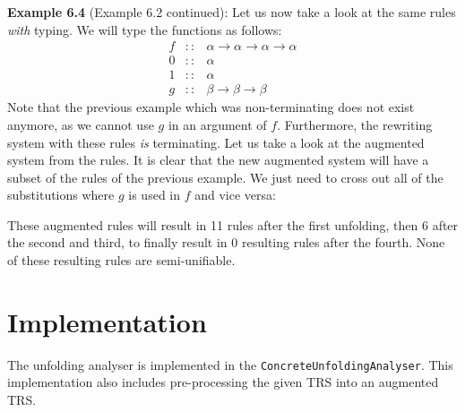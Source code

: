 \textbf{Example 6.4} (Example 6.2 continued): Let us now take a look at the same rules \textit{with} typing. We will type the functions as follows:
\[
\begin{array}{rcl}
    f & :: & \alpha \rightarrow \alpha \rightarrow \alpha \rightarrow \alpha \\
    0 & :: & \alpha \\
    1 & :: & \alpha \\
    g & :: & \beta \rightarrow \beta \rightarrow \beta 
\end{array}
\]
Note that the previous example which was non-terminating does not exist anymore, as we cannot use $g$ in an argument of $f$. Furthermore, the rewriting system with these rules \textit{is} terminating. Let us take a look at the augmented system from the rules. It is clear that the new augmented system will have a subset of the rules of the previous example. We just need to cross out all of the substitutions where $g$ is used in $f$ and vice versa:
\begin{center}
\end{center}
These augmented rules will result in 11 rules after the first unfolding, then 6 after the second and third, to finally result in 0 resulting rules after the fourth. None of these resulting rules are semi-unifiable. 

\section{Implementation}
The unfolding analyser is implemented in the \texttt{ConcreteUnfoldingAnalyser}. This implementation also includes pre-processing the given TRS into an augmented TRS.  

